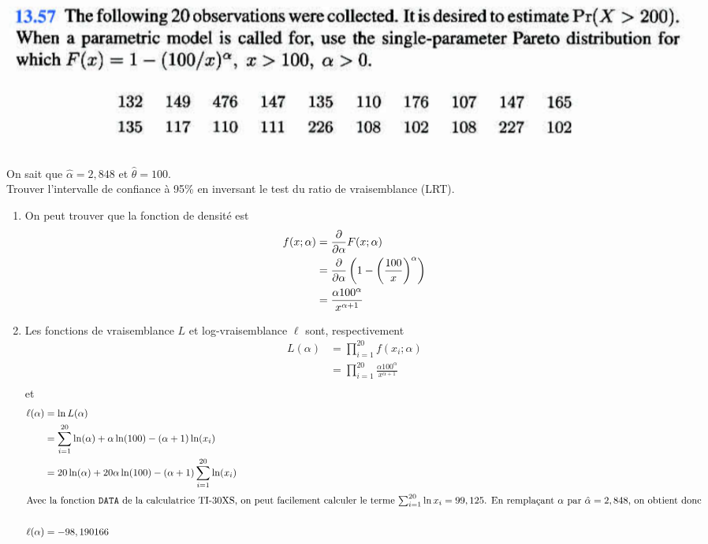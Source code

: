 \documentclass[12pt, french]{report}
\begin{document}
\begin{exemple}
\begin{center}
\includegraphics[scale=0.3]{src/LM-Q13-57.png}
\end{center}
On sait que $\hat{\alpha} = 2,848$ et $\hat{\theta} = 100$. \\
Trouver l'intervalle de confiance à 95\% en inversant le test du ratio de vraisemblance (LRT).
\tcblower %
\begin{enumerate}[label=(\arabic*)]
\item On peut trouver que la fonction de densité est
\begin{align*}
f(x ; \alpha)	& = \frac{\partial}{\partial \alpha} F(x ; \alpha) \\
& = \frac{\partial}{\partial \alpha} \left( 1 - \left( \frac{100}{x} \right)^\alpha \right) \\
& = \frac{\alpha 100^\alpha}{x^{\alpha+1}} \\
\end{align*}

\item Les fonctions de vraisemblance $L$ et log-vraisemblance $\ell$ sont, respectivement
\begin{align*}
L(\alpha)	& = \prod_{i=1}^{20} f(x_i ; \alpha) \\
& = \prod_{i=1}^{20} \frac{\alpha 100^\alpha}{x^{\alpha+1}}  \\
\end{align*}
et 
\begin{align*}
\ell(\alpha)	& = \ln L(\alpha) \\
& = \sum_{i=1}^{20} \ln (\alpha) + \alpha \ln (100) - (\alpha+1) \ln (x_i) \\
& = 20 \ln (\alpha) + 20 \alpha  \ln (100) - (\alpha + 1) \sum_{i=1}^{20} \ln (x_i) \\
\shortintertext{Avec la fonction \texttt{DATA} de la calculatrice TI-30XS, on peut facilement calculer le terme $\sum_{i=1}^{20} \ln x_i = 99,125$. En remplaçant $\alpha$ par $\hat{\alpha} = 2,848$, on obtient donc} \\
\ell(\alpha) & = - 98,190166 \\
\end{align*}


\end{enumerate}
\end{exemple}
\end{document}
